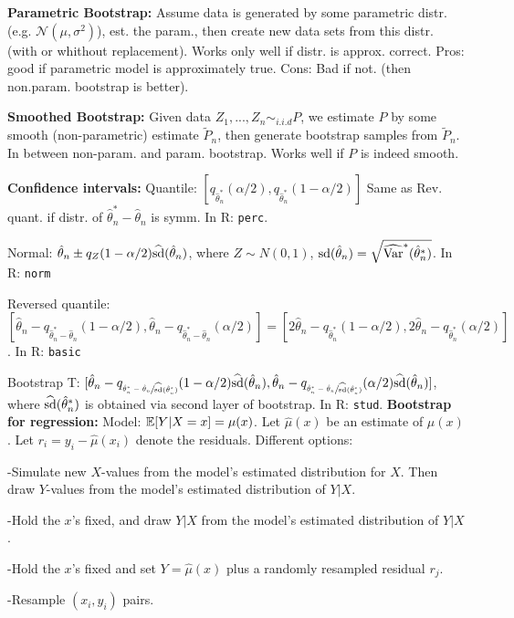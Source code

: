 \textbf{Parametric Bootstrap:}
Assume data is generated by some parametric distr. (e.g. $\mathcal{N}(\mu, \sigma^2)$), est. the param.,
then create new data sets from this distr. (with or whithout replacement). Works only well if distr. is approx. correct.
Pros: good if parametric model is approximately true. Cons: Bad if not. (then non.param. bootstrap is better).

\textbf{Smoothed Bootstrap:}
Given data $Z_1,...,Z_n \sim_{i.i.d} P$, we estimate $P$ by some smooth (non-parametric) estimate $\tilde P_n$, then generate bootstrap samples from $\tilde P_n$. In between non-param. and param. bootstrap. Works well if $P$ is indeed smooth.

\textbf{Confidence intervals:}
Quantile: $[q_{\hat\theta_n^\ast}(\alpha/2), q_{\hat\theta_n^\ast}(1-\alpha/2)]$ Same as Rev. quant. if distr. of $\hat\theta_n^\ast-\hat\theta_n$ is symm. In R: \texttt{perc}.

Normal: $\hat\theta_n \pm q_Z(1-\alpha/2)\widehat{\textup{sd}}(\hat\theta_n)$, where $Z\sim N(0,1)$, $\textup{sd}(\hat\theta_n)=\sqrt{\widehat{\textup{Var}}^\ast(\hat\theta_n^\ast)}$. In R: \texttt{norm}

Reversed quantile: $[\hat\theta_n-q_{\hat\theta_n^\ast-\hat\theta_n}(1-\alpha /2), \hat\theta_n-q_{\hat\theta_n^\ast-\hat\theta_n}(\alpha /2)]=[2\hat\theta_n-q_{\hat\theta_n^\ast}(1-\alpha/2), 2\hat\theta_n-q_{\hat\theta_n^\ast}(\alpha/2)]$. In R: \texttt{basic}

Bootstrap T: $[\hat\theta_n-q_{\sfrac{\hat\theta_n^\ast-\hat\theta_n}{\widehat{\textup{sd}}(\hat\theta_n^\ast)}}(1-\alpha/2)\widehat{\textup{sd}}(\hat\theta_n), \hat\theta_n-q_{\sfrac{\hat\theta_n^\ast-\hat\theta_n}{\widehat{\textup{sd}}(\hat\theta_n^\ast)}}(\alpha/2)\widehat{\textup{sd}}(\hat\theta_n)]$, where $\widehat{\textup{sd}}(\hat\theta_n^\ast)$ is obtained via second layer of bootstrap. In R: \texttt{stud}.
\textbf{Bootstrap for regression:}
Model: $\mathbb{E}[Y|X=x]=\mu(x)$. Let $\hat\mu(x)$ be an estimate of $\mu(x)$. Let $r_i=y_i-\hat\mu(x_i)$ denote the residuals. Different options:

-Simulate new $X$-values from the model's estimated distribution for $X$. Then draw $Y$-values from the model's estimated distribution of $Y|X$.

-Hold the $x$'s fixed, and draw $Y|X$ from the model's estimated distribution of $Y|X$.

-Hold the $x$'s fixed and set $Y=\hat\mu(x)$ plus a randomly resampled residual $r_j$.

-Resample $(x_i,y_i)$ pairs.

